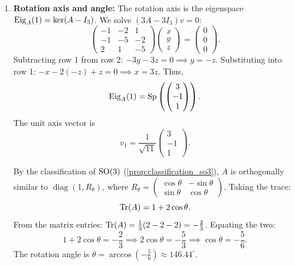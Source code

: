 \begin{exercisesolution}
\begin{enumerate}[label=\textbf{(\alph*)}]
    \item \textbf{Rotation axis and angle:}
    The rotation axis is the eigenspace $\operatorname{Eig}_A(1) = \ker(A - I_3)$.
    We solve $(3A - 3I_3)v = 0$:
    \[
    \begin{pmatrix} -1 & -2 & 1 \\ -1 & -5 & -2 \\ 2 & 1 & -5 \end{pmatrix} \begin{pmatrix} x \\ y \\ z \end{pmatrix} = \begin{pmatrix} 0 \\ 0 \\ 0 \end{pmatrix}.
    \]
    Subtracting row 1 from row 2: $-3y - 3z = 0 \implies y = -z$.
    Substituting into row 1: $-x - 2(-z) + z = 0 \implies x = 3z$.
    Thus,
    \[
    \operatorname{Eig}_A(1) = \operatorname{Sp}\left( \begin{pmatrix} 3 \\ -1 \\ 1 \end{pmatrix} \right).
    \]
    The unit axis vector is
    \[
    v_1 = \frac{1}{\sqrt{11}} \begin{pmatrix} 3 \\ -1 \\ 1 \end{pmatrix}.
    \]

    By the classification of $\operatorname{SO}(3)$ (\cref{prop:classification_so3}), $A$ is orthogonally similar to $\operatorname{diag}(1, R_\theta)$, where $R_\theta = \left(\begin{smallmatrix} \cos\theta & -\sin\theta \\ \sin\theta & \cos\theta \end{smallmatrix}\right)$.
    Taking the trace:
    \[
    \operatorname{Tr}(A) = 1 + 2\cos\theta.
    \]
    From the matrix entries: $\operatorname{Tr}(A) = \frac{1}{3}(2 - 2 - 2) = -\frac{2}{3}$.
    Equating the two:
    \[
    1 + 2\cos\theta = -\frac{2}{3} \implies 2\cos\theta = -\frac{5}{3} \implies \cos\theta = -\frac{5}{6}.
    \]
    The rotation angle is $\theta = \arccos\left(-\frac{5}{6}\right) \approx 146.44^\circ$. \qedhere
\end{enumerate}
\end{exercisesolution}

